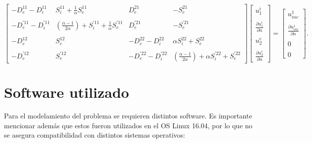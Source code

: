 \documentclass[12pt,letterpaper]{article}
\numberwithin{equation}{section}
\begin{document}
\begin{equation} 
\begin{bmatrix}
-D_{e}^{11} - D_{i}^{11} & S_{i}^{11} + \frac{1}{\alpha}S_{e}^{11} & D_{e}^{21} & -S_{e}^{21} \\
\\
-D_{e}^{'11} - D_{i}^{'11} & (\frac{\alpha - 1}{2\alpha})+ S_{i}^{'11} + \frac{1}{\alpha}S_{e}^{'11} & D_{e}^{'21} & -S_{e}^{'21}\\
\\
-D_{e}^{12} & S_{e}^{12} & -D_{e}^{22} - D_{i}^{22} & \alpha S_{i}^{22} + S_{e}^{22}\\
\\
-D_{e}^{'12} & S_{e}^{'12} & -D_{e}^{'22} - D_{i}^{'22} & (\frac{\alpha - 1}{2\alpha})+\alpha S_{i}^{'22} + S_{e}^{'22}
\end{bmatrix}
\begin{bmatrix}
u^{i}_1\\
\\
\frac{\partial u^{i}_1}{\partial n}\\
\\
u^{e}_2\\
\\
\frac{\partial u^{e}_2}{\partial n}
\end{bmatrix}
=
\begin{bmatrix}
u_{inc}^1\\
\\
\frac{\partial u_{inc}^1}{\partial n}\\
\\
0\\
\\
0
\end{bmatrix}.
\label{eq:multi2_matriz int}		 
\end{equation} 


\section{Software utilizado}

Para el modelamiento del problema se requieren distintos software. Es importante mencionar además que estos fueron utilizados en el OS Linux 16.04, por lo que no se asegura compatibilidad con distintos sistemas operativos:
\end{document}
